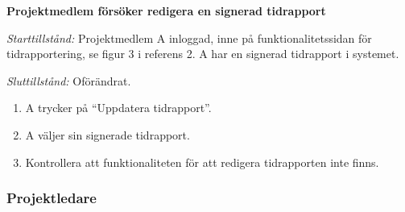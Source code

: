 \documentclass[a4paper]{article}
\begin{document}
\begin{FT}
\item
\textbf{Projektmedlem försöker redigera en signerad tidrapport}

\emph{Starttillstånd:} Projektmedlem A inloggad, inne på funktionalitetssidan för tidrapportering, se figur 3 i referens 2. A har en signerad tidrapport i systemet.

\emph{Sluttillstånd:} Oförändrat.

\begin{enumerate}
\item A trycker på ``Uppdatera tidrapport''.
\item A väljer sin signerade tidrapport.
\item Kontrollera att funktionaliteten för att redigera tidrapporten inte finns.
\end{enumerate}

\end{FT}


\subsubsection{Projektledare}
\end{document}

